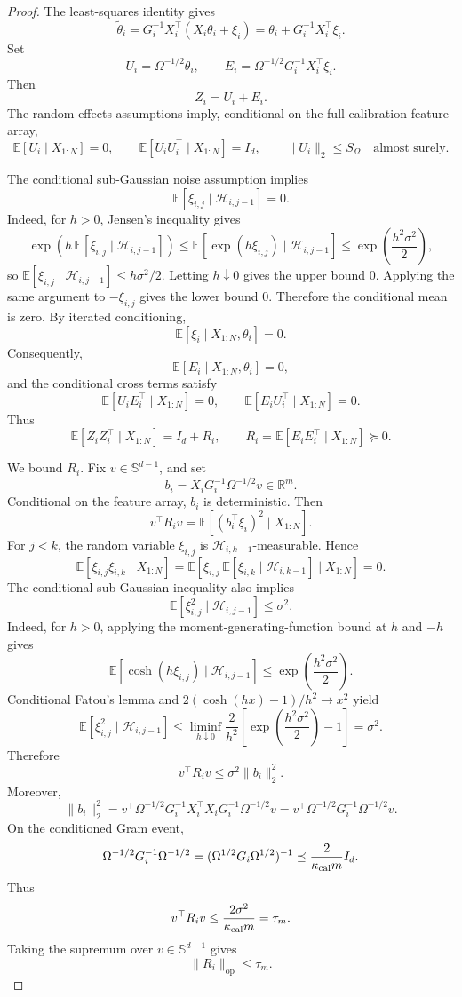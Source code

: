 \documentclass{article} %
\begin{document}
\begin{proof}
The least-squares identity gives
\[
\widetilde\theta_i
=
G_i^{-1}X_i^\top(X_i\theta_i+\xi_i)
=
\theta_i+G_i^{-1}X_i^\top\xi_i.
\]
Set
\[
U_i=\Omega^{-1/2}\theta_i,
\qquad
E_i=\Omega^{-1/2}G_i^{-1}X_i^\top\xi_i.
\]
Then
\[
Z_i=U_i+E_i.
\]
The random-effects assumptions imply, conditional on the full calibration
feature array,
\[
\mathbb{E}[U_i\mid X_{1:N}]=0,
\qquad
\mathbb{E}[U_iU_i^\top\mid X_{1:N}]=I_d,
\qquad
\|U_i\|_2\le S_\Omega
\quad\text{almost surely}.
\]

The conditional sub-Gaussian noise assumption implies
\[
\mathbb{E}[\xi_{i,j}\mid\mathcal{H}_{i,j-1}]=0.
\]
Indeed, for \(h>0\), Jensen's inequality gives
\[
\exp\!\left(h\,\mathbb{E}[\xi_{i,j}\mid\mathcal{H}_{i,j-1}]\right)
\le
\mathbb{E}\!\left[\exp(h\xi_{i,j})\mid\mathcal{H}_{i,j-1}\right]
\le
\exp\!\left(\frac{h^2\sigma^2}{2}\right),
\]
so \(\mathbb{E}[\xi_{i,j}\mid\mathcal{H}_{i,j-1}]\le h\sigma^2/2\).  Letting
\(h\downarrow0\) gives the upper bound \(0\).  Applying the same argument to
\(-\xi_{i,j}\) gives the lower bound \(0\).  Therefore the conditional mean is
zero.  By iterated conditioning,
\[
\mathbb{E}[\xi_i\mid X_{1:N},\theta_i]=0.
\]
Consequently,
\[
\mathbb{E}[E_i\mid X_{1:N},\theta_i]=0,
\]
and the conditional cross terms satisfy
\[
\mathbb{E}[U_iE_i^\top\mid X_{1:N}]=0,
\qquad
\mathbb{E}[E_iU_i^\top\mid X_{1:N}]=0.
\]
Thus
\[
\mathbb{E}[Z_iZ_i^\top\mid X_{1:N}]
=
I_d+R_i,
\qquad
R_i=\mathbb{E}[E_iE_i^\top\mid X_{1:N}]\succeq0.
\]

We bound \(R_i\).  Fix \(v\in\mathbb{S}^{d-1}\), and set
\[
b_i=X_iG_i^{-1}\Omega^{-1/2}v\in\mathbb{R}^m.
\]
Conditional on the feature array, \(b_i\) is deterministic.  Then
\[
v^\top R_i v
=
\mathbb{E}\!\left[(b_i^\top\xi_i)^2\mid X_{1:N}\right].
\]
For \(j<k\), the random variable \(\xi_{i,j}\) is
\(\mathcal{H}_{i,k-1}\)-measurable.  Hence
\[
\mathbb{E}[\xi_{i,j}\xi_{i,k}\mid X_{1:N}]
=
\mathbb{E}\!\left[
\xi_{i,j}\,
\mathbb{E}[\xi_{i,k}\mid\mathcal{H}_{i,k-1}]
\mid X_{1:N}
\right]
=
0.
\]
The conditional sub-Gaussian inequality also implies
\[
\mathbb{E}[\xi_{i,j}^2\mid\mathcal{H}_{i,j-1}]\le \sigma^2.
\]
Indeed, for \(h>0\), applying the moment-generating-function bound at \(h\)
and \(-h\) gives
\[
\mathbb E\!\left[
\cosh(h\xi_{i,j})\mid\mathcal H_{i,j-1}
\right]
\le
\exp\!\left(\frac{h^2\sigma^2}{2}\right).
\]
Conditional Fatou's lemma and
\(2(\cosh(hx)-1)/h^2\to x^2\) yield
\[
\mathbb E\!\left[
\xi_{i,j}^2\mid\mathcal H_{i,j-1}
\right]
\le
\liminf_{h\downarrow0}
\frac{2}{h^2}
\left[
\exp\!\left(\frac{h^2\sigma^2}{2}\right)-1
\right]
=
\sigma^2.
\]
Therefore
\[
v^\top R_i v
\le
\sigma^2\|b_i\|_2^2.
\]
Moreover,
\[
\|b_i\|_2^2
=
v^\top\Omega^{-1/2}G_i^{-1}X_i^\top X_iG_i^{-1}\Omega^{-1/2}v
=
v^\top\Omega^{-1/2}G_i^{-1}\Omega^{-1/2}v.
\]
On the conditioned Gram event,
\[
\Omega^{-1/2}G_i^{-1}\Omega^{-1/2}
=
(\Omega^{1/2}G_i\Omega^{1/2})^{-1}
\preceq
\frac{2}{\kappa_{\rm cal}m}I_d.
\]
Thus
\[
v^\top R_i v
\le
\frac{2\sigma^2}{\kappa_{\rm cal}m}
=
\tau_m.
\]
Taking the supremum over \(v\in\mathbb{S}^{d-1}\) gives
\[
\|R_i\|_{\mathrm{op}}\le\tau_m.
\]


\end{proof}
\end{document}
